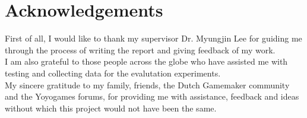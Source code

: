\documentclass[bsc, 12pt, twoside, singlespacing, parskip, abbrevs, notimes, normalheadings, logo]{styles/infthesis}
\begin{document}


\pagebreak
\section*{Acknowledgements}
First of all, I would like to thank my supervisor Dr. Myungjin Lee for guiding me through the process of writing the report and giving feedback of my work.\\
I am also grateful to those people across the globe who have assisted me with testing and collecting data for the evalutation experiments.\\
My sincere gratitude to my family, friends, the Dutch Gamemaker community and the Yoyogames forums, for providing me with assistance, feedback and ideas without which this project would not have been the same.


\vspace{43em}
\end{document}
